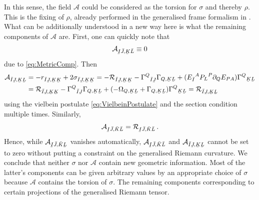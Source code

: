\documentclass[11pt,a4paper]{article}
\numberwithin{equation}{section}
\newcommand{\ubar}[1]{\underaccent{\bar}{#1}}
\newcommand{\bI}{\bar{I}}
\newcommand{\bJ}{\bar{J}}
\newcommand{\bK}{\bar{K}}
\newcommand{\bL}{\bar{L}}
\newcommand{\ubI}{\ubar{I}}
\newcommand{\ubJ}{\ubar{J}}
\newcommand{\ubK}{\ubar{K}}
\newcommand{\ubL}{\ubar{L}}
\begin{document}
In this sense, the field $\mathcal{A}$ could be considered as the torsion for $\sigma$ and thereby $\rho$. This is the fixing of $\rho$, already performed in the generalised frame formalism in \cite{Polacek:2013nla}. What can be additionally understood in a new way here is what the remaining components of $\mathcal{A}$ are. First, one can quickly note that
\begin{align}
\mathcal{A}_{\ubI \bJ , \ubK \bL} \equiv 0
\end{align}
due to \eqref{eq:MetricComp}. Then
\begin{align}
\mathcal{A}_{\bI \ubJ , \ubK \ubL} &= - r_{\bI \ubJ, \ubK \ubK} + 2 \sigma_{\bI \ubJ, \ubK \ubK} = - \mathcal{R}_{\bI \ubJ, \ubK \ubK} - {\Gamma^Q}_{\bI \ubJ} \Gamma_{Q,\ubK \ubL} + ({E_{\bI}}^A {P_L}^P \partial_Q E_{PA}) {\Gamma^Q}_{\ubK \ubL} \nonumber\\
&= \mathcal{R}_{\bI \ubJ, \ubK \ubK} - {\Gamma^Q}_{\bI \ubJ} \Gamma_{Q,\ubK \ubL} + (- \Omega_{Q,\ubK \ubL} + \Gamma_{Q,\ubK \ubL}){\Gamma^Q}_{\ubK \ubL} =\mathcal{R}_{\bI \ubJ , \ubK \ubL}
\end{align}
using the vielbein postulate \eqref{eq:VielbeinPostulate} and the section condition multiple times. Similarly,
\begin{equation}
\mathcal{A}_{\ubI \bJ , \bK \bL} = \mathcal{R}_{\ubI\bJ , \bK \bL}\,.
\end{equation}
Hence, while $\mathcal{A}_{\ubI \bJ , \bK \ubL}$ vanishes automatically, $\mathcal{A}_{\ubI \bJ , \bK \bL}$ and $\mathcal{A}_{\bI \ubJ , \ubK \ubL}$ cannot be set to zero without putting a constraint on the generalised Riemann curvature. We conclude that neither $\sigma$ nor $\mathcal{A}$ contain new geometric information. Most of the latter's components can be given arbitrary values by an appropriate choice of $\sigma$ because $\mathcal{A}$ contains the torsion of $\sigma$. The remaining components corresponding to certain projections of the generalised Riemann tensor.
\end{document}
